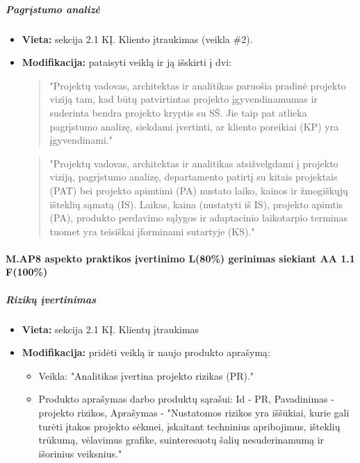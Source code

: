 \documentclass{article}
\begin{document}
\subparagraph{Pagrįstumo analizė}
\begin{itemize}
    \item \textbf{Vieta:} sekcija 2.1 KĮ. Kliento įtraukimas (veikla \#2).
    \item \textbf{Modifikacija:} pataisyti veiklą ir ją išskirti į dvi:
    \begin{quote}
        "Projektų vadovas, architektas ir analitikas paruošia pradinė projekto viziją tam, kad būtų patvirtintas projekto įgyvendinamumas ir suderinta bendra projekto kryptis su SŠ. Jie taip pat atlieka pagrįstumo analizę, siekdami įvertinti, ar kliento poreikiai (KP) yra įgyvendinami." 
    \end{quote}
    
    \begin{quote}
        "Projektų vadovas, architektas ir analitikas  atsižvelgdami į projekto viziją, pagrįstumo analizę, departamento patirtį su kitais projektais (PAT) bei projekto apimtimi (PA) nustato laiko, kainos ir žmogiškųjų išteklių sąmatą (IS). Laikas, kaina (nustatyti iš IS), projekto apimtis (PA), produkto perdavimo sąlygos ir adaptacinio laikotarpio terminas tuomet yra teisiškai įforminami sutartyje (KS)."
    \end{quote}
\end{itemize}

\paragraph{M.AP8 aspekto praktikos įvertinimo L(80\%) gerinimas siekiant AA 1.1 F(100\%)}

\subparagraph{Rizikų įvertinimas}
\begin{itemize}
    \item \textbf{Vieta:} sekcija 2.1 KĮ. Klientų įtraukimas
    \item \textbf{Modifikacija:} pridėti veiklą ir naujo produkto aprašymą:
    \begin{itemize}
        \item Veikla: "Analitikas įvertina projekto rizikas (PR)."
        \item Produkto aprašymas darbo produktų sąrašui: Id - PR, Pavadinimas - projekto rizikos, Aprašymas - "Nustatomos rizikos yra iššūkiai, kurie gali turėti įtakos projekto sėkmei, įskaitant techninius apribojimus, išteklių trūkumą, vėlavimus grafike, suinteresuotų šalių nesuderinamumą ir išorinius veiksnius."
    \end{itemize}
\end{itemize}
\end{document}
